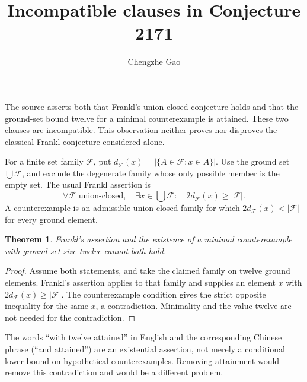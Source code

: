 \documentclass[11pt]{article}
\newtheorem{theorem}{Theorem}
\begin{document}
\title{Incompatible clauses in Conjecture 2171}
\author{Chengzhe Gao}\date{}\maketitle
The source asserts both that Frankl's union-closed conjecture holds and
that the ground-set bound twelve for a minimal counterexample is attained.
These two clauses are incompatible. This observation neither proves nor
disproves the classical Frankl conjecture considered alone.

For a finite set family $\mathcal F$, put
$d_{\mathcal F}(x)=|\{A\in\mathcal F:x\in A\}|$.
Use the ground set $\bigcup\mathcal F$, and exclude the degenerate family
whose only possible member is the empty set. The usual Frankl assertion is
\[
 \forall\mathcal F\text{ union-closed},\quad
 \exists x\in\bigcup\mathcal F:\quad
 2d_{\mathcal F}(x)\geq|\mathcal F|.
\]
A counterexample is an admissible union-closed family for which
$2d_{\mathcal F}(x)<|\mathcal F|$ for every ground element.

\begin{theorem}
Frankl's assertion and the existence of a minimal counterexample with
ground-set size twelve cannot both hold.
\end{theorem}
\begin{proof}
Assume both statements, and take the claimed family on twelve ground
elements. Frankl's assertion applies to that family and supplies an element
$x$ with $2d_{\mathcal F}(x)\geq|\mathcal F|$. The counterexample condition
gives the strict opposite inequality for the same $x$, a contradiction.
Minimality and the value twelve are not needed for the contradiction.
\end{proof}

The words ``with twelve attained'' in English and the corresponding Chinese phrase (``and attained'')
are an existential assertion, not merely a conditional lower bound on
hypothetical counterexamples. Removing attainment would remove this
contradiction and would be a different problem.
\end{document}
